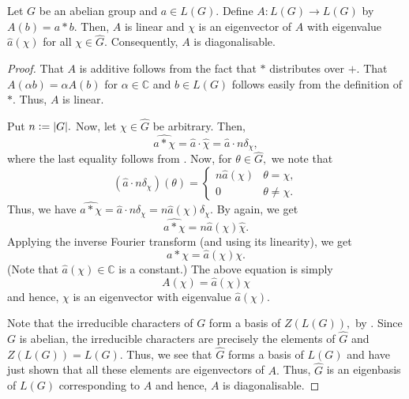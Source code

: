 \begin{lem} \label{lem:convolvediagonal}
    Let $G$ be an abelian group and $a \in L(G).$ Define $A : L(G) \to L(G)$ by $A(b) = a * b.$ Then, $A$ is linear and $\chi$ is an eigenvector of $A$ with eigenvalue $\widehat{a}(\chi)$ for all $\chi \in \widehat{G}.$ Consequently, $A$ is diagonalisable.
\end{lem}
\begin{proof} 
    That $A$ is additive follows from the fact that $*$ distributes over $+.$ That $A(\alpha b) = \alpha A(b)$ for $\alpha \in \mathbb{C}$ and $b \in L(G)$ follows easily from the definition of $*.$ Thus, $A$ is linear.

    Put $n \vcentcolon= {\left\lvert G \right\lvert}.$ Now, let $\chi \in \widehat{G}$ be arbitrary. Then,
    \begin{equation*} 
        \widehat{a * \chi} = \widehat{a} \cdot \widehat{\chi} = \widehat{a} \cdot n \delta_\chi,
    \end{equation*}
    where the last equality follows from . Now, for $\theta \in \widehat{G},$ we note that
    \begin{equation*} 
        (\widehat{a} \cdot n \delta_\chi)(\theta) = \begin{cases}
            n\widehat{a}(\chi) & \theta = \chi,\\
            0 & \theta \neq \chi.   
        \end{cases}
    \end{equation*}
    Thus, we have $\widehat{a * \chi} = \widehat{a} \cdot n \delta_\chi = n \widehat{a}(\chi) \delta_\chi.$ By  again, we get
    \begin{equation*} 
        \widehat{a * \chi} = n \widehat{a}(\chi) \widehat{\chi}.
    \end{equation*}
    Applying the inverse Fourier transform (and using its linearity), we get
    \begin{equation*} 
        a * \chi = \widehat{a}(\chi) \chi.
    \end{equation*}
    (Note that $\widehat{a}(\chi) \in \mathbb{C}$ is a constant.) The above equation is simply
    \begin{equation*} 
        A(\chi) = \widehat{a}(\chi)\chi
    \end{equation*}
    and hence, $\chi$ is an eigenvector with eigenvalue $\widehat{a}(\chi).$

    Note that the irreducible characters of $G$ form a basis of $Z(L(G)),$ by . Since $G$ is abelian, the irreducible characters are precisely the elements of $\widehat{G}$ and $Z(L(G)) = L(G).$ Thus, we see that $\widehat{G}$ forms a basis of $L(G)$ and have just shown that all these elements are eigenvectors of $A.$ Thus, $\widehat{G}$ is an eigenbasis of $L(G)$ corresponding to $A$ and hence, $A$ is diagonalisable.
\end{proof}

